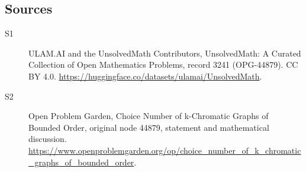 \documentclass[11pt]{article}
\begin{document}
\subsection{Sources}
\begin{description}
\item[\hypertarget{source:3241:1}{S1}] ULAM.AI and the UnsolvedMath Contributors, UnsolvedMath: A Curated Collection of Open Mathematics Problems, record 3241 (OPG-44879). CC BY 4.0. \url{https://huggingface.co/datasets/ulamai/UnsolvedMath}.
\item[\hypertarget{source:3241:2}{S2}] Open Problem Garden, Choice Number of k-Chromatic Graphs of Bounded Order, original node 44879, statement and mathematical discussion. \url{https://www.openproblemgarden.org/op/choice_number_of_k_chromatic_graphs_of_bounded_order}.
\end{description}
\label{end:3241}
\end{document}
